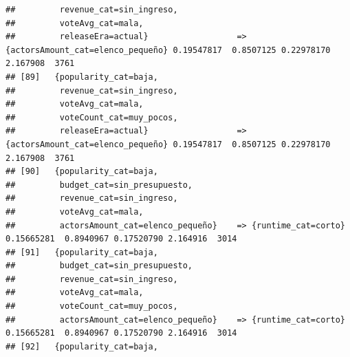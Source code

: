\documentclass[
]{article}
\begin{document}
\begin{verbatim}
##         revenue_cat=sin_ingreso,                                                                                                
##         voteAvg_cat=mala,                                                                                                       
##         releaseEra=actual}                  => {actorsAmount_cat=elenco_pequeño} 0.19547817  0.8507125 0.22978170 2.167908  3761
## [89]   {popularity_cat=baja,                                                                                                    
##         revenue_cat=sin_ingreso,                                                                                                
##         voteAvg_cat=mala,                                                                                                       
##         voteCount_cat=muy_pocos,                                                                                                
##         releaseEra=actual}                  => {actorsAmount_cat=elenco_pequeño} 0.19547817  0.8507125 0.22978170 2.167908  3761
## [90]   {popularity_cat=baja,                                                                                                    
##         budget_cat=sin_presupuesto,                                                                                             
##         revenue_cat=sin_ingreso,                                                                                                
##         voteAvg_cat=mala,                                                                                                       
##         actorsAmount_cat=elenco_pequeño}    => {runtime_cat=corto}               0.15665281  0.8940967 0.17520790 2.164916  3014
## [91]   {popularity_cat=baja,                                                                                                    
##         budget_cat=sin_presupuesto,                                                                                             
##         revenue_cat=sin_ingreso,                                                                                                
##         voteAvg_cat=mala,                                                                                                       
##         voteCount_cat=muy_pocos,                                                                                                
##         actorsAmount_cat=elenco_pequeño}    => {runtime_cat=corto}               0.15665281  0.8940967 0.17520790 2.164916  3014
## [92]   {popularity_cat=baja,                                                                                                    

\end{verbatim}
\end{document}
